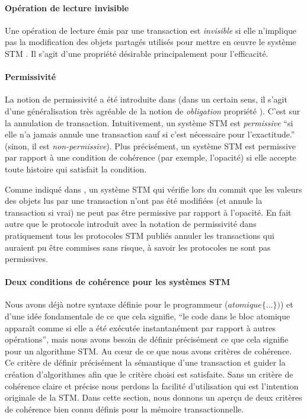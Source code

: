 \paragraph{Opération de lecture invisible}
Une opération de lecture émis par une transaction est {\it invisible}
si elle n'implique pas la modification des objets partagés utilisés pour mettre en œuvre le système STM \cite{MSHAESS06}.
Il s'agit d'une propriété désirable principalement pour l'efficacité.


\paragraph{Permissivité}
La notion de permissivité a été introduite dans \cite{GHS08} (dans un certain sens,
il s'agit d'une généralisation très agréable de la notion de {\it obligation} propriété \cite{a-IR09}). C'est sur la annulation de transaction.
Intuitivement, un système STM est {\it permissive} ``si elle n'a jamais annule une transaction sauf si c'est nécessaire pour l'exactitude.''
(sinon, il est {\it non-permissive}). Plus précisément, un système STM est permissive par rapport à une condition de cohérence
(par exemple, l'opacité) si elle accepte toute histoire qui satisfait la condition.

Comme indiqué dans \cite{GHS08}, un système STM qui vérifie lors du commit que les
valeurs des objets lus par une transaction n'ont pas été modifiées (et annule la transaction si vrai) ne peut pas être permissive par rapport à l'opacité.
En fait autre que le protocole introduit avec la notation de permissivité dans \cite{GHS08} pratiquement
tous les protocoles STM publiés annuler les transactions qui auraient pu être commises sans risque, à savoir les protocoles ne sont pas permissives.


\paragraph{Deux conditions de cohérence pour les systèmes STM}
Nous avons déjà notre syntaxe définie pour le programmeur ($atomique \{ \dots \})$) et d'une idée fondamentale de ce que cela signifie,
``le code dans le bloc atomique apparaît comme si elle a été exécutée instantanément par rapport à autres opérations'',
mais nous avons besoin de définir précisément ce que cela signifie pour un algorithme STM.
Au cœur de ce que nous avons critères de cohérence.
Ce critère de définir précisément la sémantique d'une transaction et guider la création d'algorithmes afin que le critère choisi est satisfaite.
Sans un critère de cohérence claire et précise nous perdons la facilité d'utilisation qui est l'intention originale de la STM.
Dans cette section, nous donnons un aperçu de deux critères de cohérence bien connu définis pour la mémoire transactionnelle.



